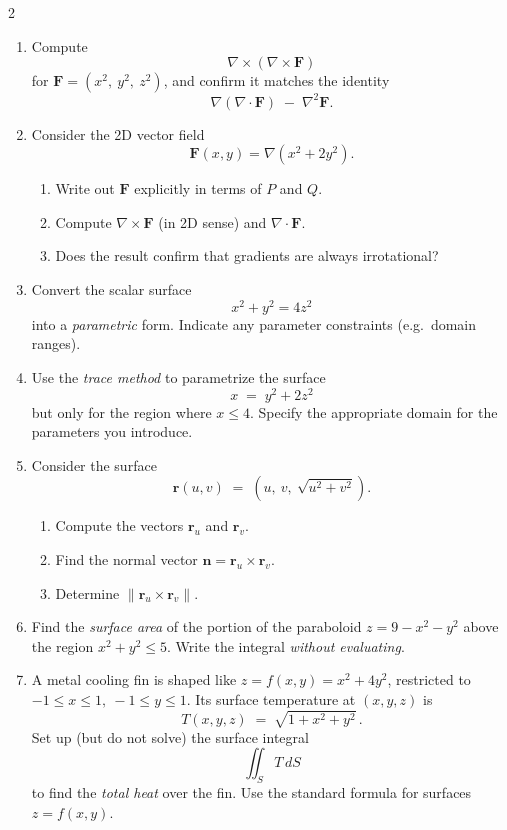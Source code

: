 \begin{multicols}{2}
\begin{enumerate}
\item \enspace
Compute
\[
\nabla \times (\nabla \times \mathbf{F})
\]
for $\mathbf{F} = (x^2,\ y^2,\ z^2)$, and confirm it matches the identity
\[
\nabla(\nabla \cdot \mathbf{F}) \;-\; \nabla^2 \mathbf{F}.
\]

\item \enspace
Consider the 2D vector field
\[
\mathbf{F}(x,y) = \nabla\left(x^2 + 2y^2\right).
\]
\begin{enumerate}
\item Write out $\mathbf{F}$ explicitly in terms of $P$ and $Q$. 
\item Compute $\nabla \times \mathbf{F}$ (in 2D sense) and $\nabla \cdot \mathbf{F}$.
\item Does the result confirm that gradients are always irrotational?
\end{enumerate}

\item 
Convert the scalar surface
\[
x^2 + y^2 = 4z^2
\]
into a \emph{parametric} form. Indicate any parameter constraints (e.g.\ domain ranges).

\item \enspace
Use the \emph{trace method} to parametrize the surface
\[
x \;=\; y^2 + 2z^2
\]
but only for the region where \(x\leq 4\). Specify the appropriate domain for the parameters you introduce.

\item \enspace
Consider the surface
\[
\mathbf{r}(u,v) \;=\; (u,\ v,\ \sqrt{u^2+v^2}) .
\]
\begin{enumerate}
\item Compute the vectors \(\mathbf{r}_u\) and \(\mathbf{r}_v\).
\item Find the normal vector \(\mathbf{n} = \mathbf{r}_u \times \mathbf{r}_v\).
\item Determine \(\|\mathbf{r}_u \times \mathbf{r}_v\|\).
\end{enumerate}

\item \enspace
Find the \emph{surface area} of the portion of the paraboloid \(z=9-x^2-y^2\) above the region \(x^2+y^2 \le 5\). Write the integral \emph{without evaluating}.

\item \enspace
A metal cooling fin is shaped like \(z = f(x,y) = x^2 + 4y^2\), restricted to \(-1\le x \le 1,\ -1\le y \le 1\). Its surface temperature at \((x,y,z)\) is 
\[
T(x,y,z) \;=\; \sqrt{1 + x^2 + y^2}\,.
\]
Set up (but do not solve) the surface integral
\[
\iint_S T\,dS
\]
to find the \emph{total heat} over the fin. Use the standard formula for surfaces \(z=f(x,y)\).


\end{enumerate}
\end{multicols}
